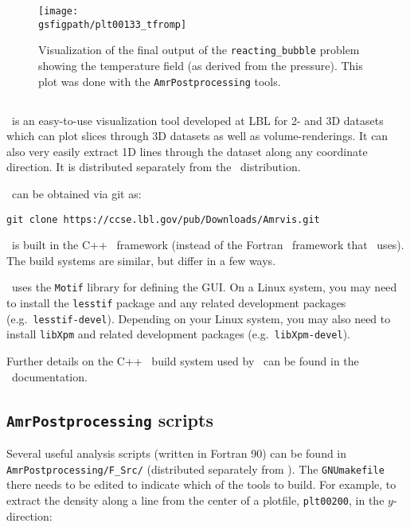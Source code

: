 \begin{figure}[t]
\centering
\texttt{[image: \\gsfigpath/plt00133\_tfromp]}
\caption[Visualization of {\tt reacting\_bubble} output]{\label{fig:gettingstarted:test2} Visualization of the
final output of the {\tt reacting\_bubble} problem showing the temperature
field (as derived from the pressure).  This plot was done with
the {\tt AmrPostprocessing} tools.}
\end{figure}



\subsection{\amrvis}

\amrvis\ is an easy-to-use visualization tool developed at LBL for
2- and 3D datasets which can plot slices through 3D datasets as well
as volume-renderings.  It can also very easily extract 1D lines
through the dataset along any coordinate direction.  It is distributed
separately from the \maestro\ distribution.

\amrvis\ can be obtained via git as:
\begin{verbatim}
git clone https://ccse.lbl.gov/pub/Downloads/Amrvis.git
\end{verbatim}
\amrvis\ is built in the C++ \amrex\ framework (instead of the Fortran 
\amrex\ framework that \maestro\ uses).  The build systems are similar,
but differ in a few ways.  

\amrvis\ uses the {\tt Motif} library for defining the GUI.  On a Linux 
system, you may need to install the {\tt lesstif} package and any
related development packages (e.g.\ {\tt lesstif-devel}).  Depending
on your Linux system, you may also need to install {\tt libXpm} and
related development packages (e.g.\ {\tt libXpm-devel}).  

Further details on the C++ \amrex\ build system used by \amrvis\
can be found in the \amrex\ documentation.


\subsection{{\tt AmrPostprocessing} scripts}

Several useful analysis scripts (written in Fortran 90) can be found
in {\tt AmrPostprocessing/F\_Src/} (distributed separately
from \maestro).  The {\tt GNUmakefile} there needs to be edited to
indicate which of the tools to build.  For example, to extract the
density along a line from the center of a plotfile, {\tt plt00200}, in
the $y$-direction:

